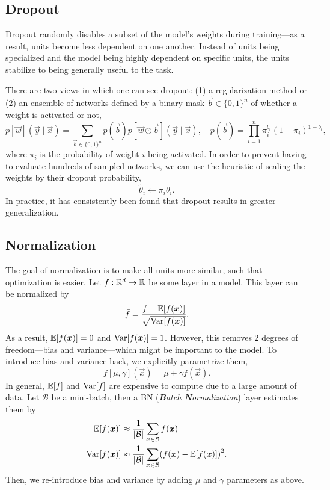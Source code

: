 \subsection{Dropout}

Dropout \citep{srivastava2014dropout} randomly disables a subset of the model's weights during
training---as a result, units become less dependent on one another. Instead of units being
specialized and the model being highly dependent on specific units, the units stabilize to being
generally useful to the task.

There are two views in which one can see dropout: (1) a regularization method or (2) an ensemble of
networks defined by a binary mask $\vec{b} \in \{ 0,1 \}^n$ of whether a weight is activated or
not, \[
    p[\vec{w}](\vec{y} \mid \vec{x}) = \sum_{\vec{b} \in \{ 0,1 \}^n} p(\vec{b}) p[\vec{w} \odot \vec{b}](\vec{y} \mid \vec{x}), \quad p(\vec{b}) = \prod_{i=1}^n \pi^{b_i}_i (1-\pi_i)^{1-b_i},
\]
where $\pi_i$ is the probability of weight $i$ being activated. In order to prevent having to
evaluate hundreds of sampled networks, we can use the heuristic of scaling the weights by their
dropout probability, \[
    \tilde{\theta}_i \gets \pi_i \theta_i.
\]
In practice, it has consistently been found that dropout results in greater generalization.

\subsection{Normalization}

The goal of normalization is to make all units more similar, such that optimization is easier. Let
$f: \mathbb{R}^d \to \mathbb{R}$ be some layer in a model. This layer can be normalized by \[
    \bar{f} = \frac{f - \mathbb{E}[f(\bm{x})]}{\sqrt{\mathrm{Var}[f(\bm{x})]}}.
\]
As a result, $\mathbb{E}[\bar{f}(\bm{x})] = 0$ and $\mathrm{Var}[\bar{f}(\bm{x})] = 1$. However, this removes 2
degrees of freedom---bias and variance---which might be important to the model. To introduce bias
and variance back, we explicitly parametrize them, \[
    \bar{f}[\mu, \gamma](\vec{x}) = \mu + \gamma \bar{f}(\vec{x}).
\]
In general, $\mathbb{E}[f]$ and $\mathrm{Var}[f]$ are expensive to compute due to a large amount of data. Let
$\mathcal{B}$ be a mini-batch, then a BN (\textit{\textbf{B}atch \textbf{N}ormalization})
\citep{ioffe2015batch} layer estimates them by
\begin{align*}
    \E[f(\vec{x})]   & \approx \frac{1}{|\mathcal{B}|} \sum_{\vec{x} \in \mathcal{B}} f(\vec{x})                                 \\
    \Var[f(\vec{x})] & \approx \frac{1}{|\mathcal{B}|} \sum_{\vec{x} \in \mathcal{B}} \lft( f(\vec{x}) - \E[f(\vec{x})] \rgt)^2.
\end{align*}
Then, we re-introduce bias and variance by adding $\mu$ and $\gamma$ parameters as above.

